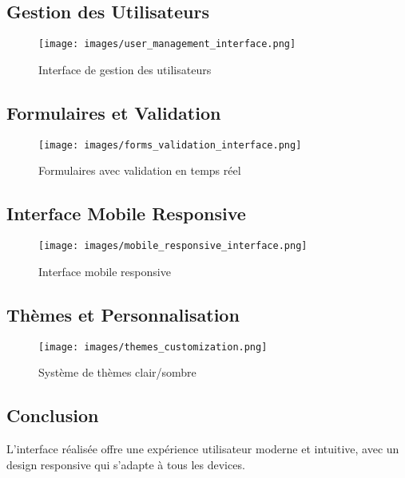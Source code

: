 \subsection{Gestion des Utilisateurs}

\begin{figure}[H]
    \centering
    \texttt{[image: images/user\_management\_interface.png]}
    \caption{Interface de gestion des utilisateurs}
    \label{fig:user_management}
\end{figure}

\subsection{Formulaires et Validation}

\begin{figure}[H]
    \centering
    \texttt{[image: images/forms\_validation\_interface.png]}
    \caption{Formulaires avec validation en temps réel}
    \label{fig:forms_validation}
\end{figure}

\subsection{Interface Mobile Responsive}

\begin{figure}[H]
    \centering
    \texttt{[image: images/mobile\_responsive\_interface.png]}
    \caption{Interface mobile responsive}
    \label{fig:mobile_interface}
\end{figure}

\subsection{Thèmes et Personnalisation}

\begin{figure}[H]
    \centering
    \texttt{[image: images/themes\_customization.png]}
    \caption{Système de thèmes clair/sombre}
    \label{fig:themes}
\end{figure}

\subsection{Conclusion}

L'interface réalisée offre une expérience utilisateur moderne et intuitive, avec un design responsive qui s'adapte à tous les devices.

